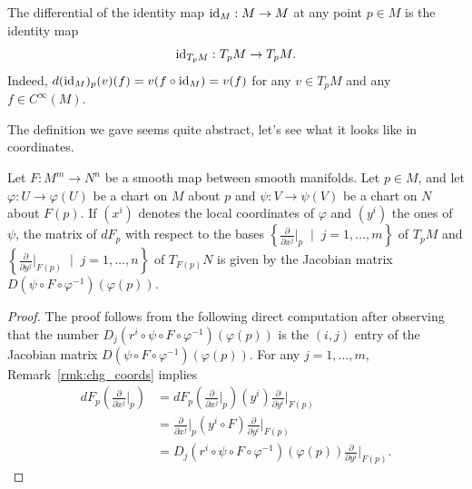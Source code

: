 \begin{remark}
	The differential of the identity map $\operatorname{id}_M:M\to M$ at any point $p\in M$ is the identity map
	\begin{equation}
		\operatorname{id}_{T_pM}: T_pM \to T_pM.
	\end{equation}
	Indeed, $d (\operatorname{id}_M)_p(v)(f) = v(f\circ\operatorname{id}_M) = v(f)$ for any $v\in T_pM$ and any $f\in C^\infty(M)$.
\end{remark}

The definition we gave seems quite abstract, let's see what it looks like in coordinates.

\begin{proposition}\label{prop:DiffCoords}
	Let $F:M^m\to N^n$ be a smooth map between smooth manifolds.
	Let $p\in M$, and let $\varphi : U \to \varphi(U)$ be a chart on $M$ about $p$ and $\psi: V \to \psi(V)$ be a chart on $N$ about $F(p)$.
	If $(x^i)$ denotes the local coordinates of $\varphi$ and $(y^i)$ the ones of $\psi$, the matrix of $dF_p$ with respect to the bases $\left\{\frac{\partial}{\partial x^j}\big|_p \;\mid\; j=1,\ldots,m\right\}$ of $T_pM$ and $\left\{\frac{\partial}{\partial y^j}\big|_{F(p)} \;\mid\; j=1,\ldots,n\right\}$ of $T_{F(p)}N$ is given by the Jacobian matrix $D(\psi\circ F \circ\varphi^{-1})(\varphi(p))$.
\end{proposition}
\begin{proof}
	The proof follows from the following direct computation after observing that the number $D_j(r^i \circ \psi \circ F \circ \varphi^{-1})(\varphi(p))$ is the $(i,j)$ entry of the Jacobian matrix $D(\psi\circ F \circ\varphi^{-1})(\varphi(p))$. For any $j=1,\ldots,m$, Remark~\ref{rmk:chg_coords} implies
	\begin{align}
		dF_p \left(\frac{\partial}{\partial x^j}\Big|_p\right)
		 & =                                                                                                   %
		dF_p \left(\frac{\partial}{\partial x^j}\Big|_p\right) (y^i) \frac{\partial}{\partial y^i}\Big|_{F(p)} \\
		 & =                                                                                                   %
		\frac{\partial}{\partial x^j}\Big|_p (y^i \circ F) \frac{\partial}{\partial y^i}\Big|_{F(p)}           \\
		 & =                                                                                                   %
		D_j(r^i \circ \psi \circ F \circ \varphi^{-1})(\varphi(p)) \frac{\partial}{\partial y^i}\Big|_{F(p)}.
	\end{align}
\end{proof}

